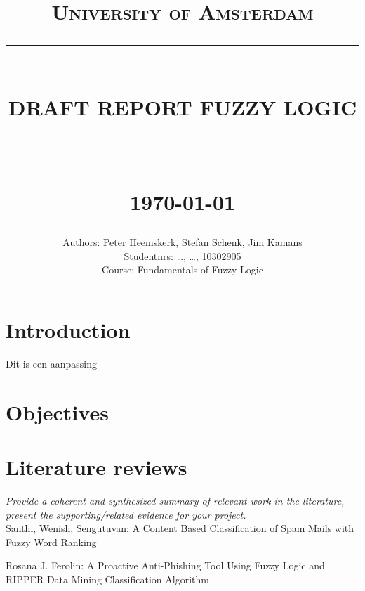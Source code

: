 \documentclass[a4paper]{article}
\newcommand{\HRule}[1]{\rule{\linewidth}{#1}}
\begin{document}
\title{ \normalsize \textsc{University of Amsterdam}
    \\ [2.0cm]
    \HRule{0.5pt} \\
    \LARGE \textbf{\uppercase{Draft Report Fuzzy Logic}}
    \HRule{2pt} \\ [0.5cm]
    \normalsize \today \vspace*{5\baselineskip}}

\date{}

\author{
    Authors: Peter Heemskerk, Stefan Schenk, Jim Kamans \\
    Studentnrs: \dots, \dots, 10302905 \\
        Course: Fundamentals of Fuzzy Logic}

\maketitle
\newpage

\tableofcontents
\newpage

\sectionfont{\scshape}

\section{Introduction}
\lipsum
Dit is een aanpassing

\section{Objectives}
\lipsum

\section{Literature reviews}

\textit{Provide a coherent and synthesized summary of relevant work in the literature, present the supporting/related evidence for your project.} \\

Santhi, Wenish, Sengutuvan: A Content Based Classification of Spam Mails with Fuzzy Word Ranking

Rosana J. Ferolin: A Proactive Anti-Phishing Tool Using Fuzzy Logic and RIPPER Data Mining Classification Algorithm
\end{document}
